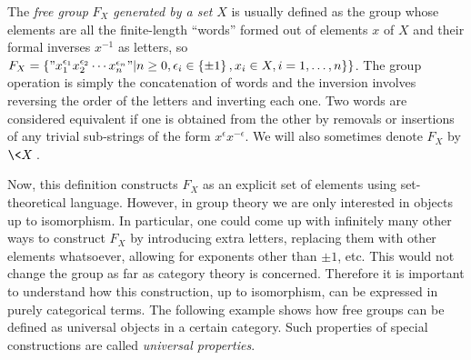 \begin{defn}
The \emph{free group} $F_{X}$ \emph{generated by a set} $X$
is usually defined as the group whose elements are all the finite-length
``words'' formed out of elements $x$ of $X$ and their formal inverses
$x^{-1}$ as letters, so $F_{X}=\left\{ "x_{1}^{\epsilon_{1}}x_{2}^{\epsilon_{2}}\cdots x_{n}^{\epsilon_{n}}"|n\geq0,\epsilon_{i}\in\left\{ \pm1\right\} ,x_{i}\in X,i=1,\ldots,n\}\right\} $.
The group operation is simply the concatenation of words and the inversion
involves reversing the order of the letters and inverting each one. Two words are considered equivalent if one is obtained from the other by removals or insertions of any trivial sub-strings of the form $x^{\epsilon}x^{-\epsilon}$. We will also sometimes denote $F_X$ by $\<X\>$.
\end{defn}
Now, this definition constructs $F_{X}$ as an explicit set of elements
using set-theoretical language. However, in group theory we are only
interested in objects up to isomorphism. In particular, one could
come up with infinitely many other ways to construct $F_{X}$ by introducing
extra letters, replacing them with other elements whatsoever, allowing for exponents other than $\pm 1$, etc. This
would not change the group as far as category theory is concerned.
Therefore it is important to understand how this construction, up
to isomorphism, can be expressed in purely categorical terms. The
following example shows how free groups can be defined as universal
objects in a certain category. Such properties of special constructions
are called \emph{universal properties}.
